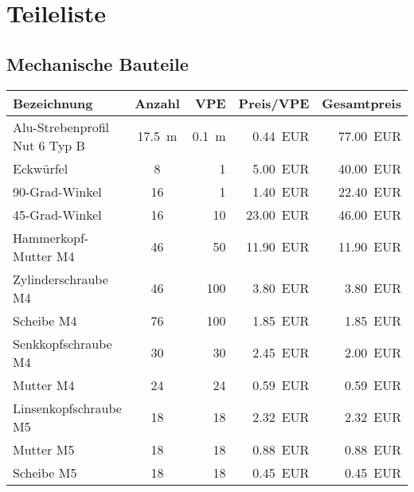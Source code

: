 \documentclass[./00PhotoBox.tex]{subfiles}
\begin{document}
\chapter{Teileliste}
\label{ch:teileliste}
\section{Mechanische Bauteile}


\begin{table}[ht]
    \centering
    \begin{tabular}{l|c|r|r|r}
        Bezeichnung                   & Anzahl           & \acrshort{VPE}   & Preis/\acrshort{VPE} & Gesamtpreis      \\
        \hline
        Alu-Strebenprofil Nut 6 Typ B & \SI{17,5}{\metre} & \SI{0,1}{\metre} & \SI{0,44}{EUR}       & \SI{77,00}{EUR}  \\
        Eckwürfel                     & 8                & 1                & \SI{5,00}{EUR}       & \SI{40,00}{EUR}  \\
        90-Grad-Winkel                & 16               & 1                & \SI{1,40}{EUR}       & \SI{22,40}{EUR}  \\
        45-Grad-Winkel                & 16               & 10               & \SI{23,00}{EUR}      & \SI{46,00}{EUR}  \\
        Hammerkopf-Mutter M4          & 46               & 50               & \SI{11,90}{EUR}      & \SI{11,90}{EUR}  \\
        Zylinderschraube M4           & 46               & 100              & \SI{3,80}{EUR}       & \SI{3,80}{EUR}   \\
        Scheibe M4                    & 76               & 100              & \SI{1,85}{EUR}       & \SI{1,85}{EUR}   \\
        Senkkopfschraube M4           & 30               & 30               & \SI{2,45}{EUR}       & \SI{2,00}{EUR}   \\
        Mutter M4                     & 24               & 24               & \SI{0,59}{EUR}       & \SI{0,59}{EUR}   \\
        Linsenkopfschraube M5         & 18               & 18               & \SI{2,32}{EUR}       & \SI{2,32}{EUR}   \\ %
        Mutter M5                     & 18               & 18               & \SI{0,88}{EUR}       & \SI{0,88}{EUR}   \\
        Scheibe M5                    & 18               & 18               & \SI{0,45}{EUR}       & \SI{0,45}{EUR}   \\

\end{tabular}
\end{table}
\end{document}

